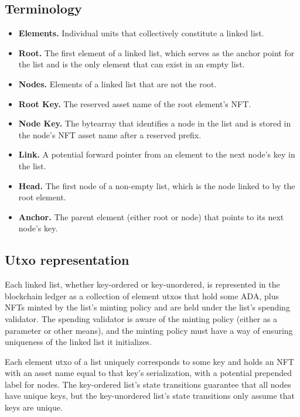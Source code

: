 \documentclass[../midgard.tex]{subfiles}
\begin{document}
\subsection{Terminology}
\label{h:list-terminology}
\begin{itemize}
  \item \textbf{Elements.} Individual units that collectively constitute a linked list.
  \item \textbf{Root.} The first element of a linked list, which serves as the anchor point for the list and is the only element that can exist in an empty list.
  \item \textbf{Nodes.} Elements of a linked list that are not the root.
  \item \textbf{Root Key.} The reserved asset name of the root element's NFT.
  \item \textbf{Node Key.} The bytearray that identifies a node in the list and is stored in the node's NFT asset name after a reserved prefix.
  \item \textbf{Link.} A potential forward pointer from an element to the next node's key in the list.
  \item \textbf{Head.} The first node of a non-empty list, which is the node linked to by the root element.
  \item \textbf{Anchor.} The parent element (either root or node) that points to its next node's key.
\end{itemize}

\subsection{Utxo representation}
\label{h:list-utxo-representation}

Each linked list, whether key-ordered or key-unordered, is represented in the blockchain ledger as a collection of element utxos that hold some ADA, plus NFTs minted by the list's minting policy and are held under the list's spending validator.
The spending validator is aware of the minting policy (either as a parameter or other means), and the minting policy must have a way of ensuring uniqueness of the linked list it initializes.

Each element utxo of a list uniquely corresponds to some  key and holds an NFT with an asset name equal to that key's serialization, with a potential prepended label for nodes.
The key-ordered list's state transitions guarantee that all nodes have unique keys, but the key-unordered list's state transitions only assume that keys are unique.
\end{document}

